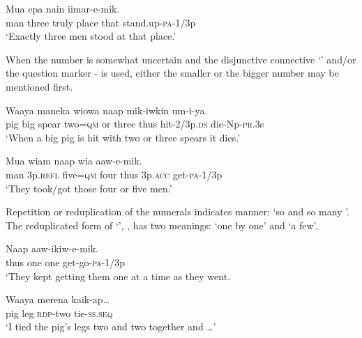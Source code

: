 \ea%
\label{ex:3:x661}
\gll Mua   epa nain iimar-e-mik. \\
man three truly place that stand.up-\textsc{pa}-1/3p\\
\glt`Exactly three men stood at that place.'
\z

When the number is somewhat uncertain and the disjunctive connective  `' and/or the question marker - is used, either the smaller or the bigger number may be mentioned first.

\ea%
\label{ex:3:x1416}
\gll Waaya maneka wiowa    naap mik-iwkin um-i-ya.\\
pig big spear two=\textsc{qm} or three thus hit-2/3p.\textsc{ds} die-Np-\textsc{pr}.3s\\
\glt`When a big pig is hit with two or three spears it dies.'
\z

\ea%
\label{ex:3:x92}
\gll Mua wiam   naap wia aaw-e-mik. \\
man 3p.\textsc{refl} five=\textsc{qm} four thus 3p.\textsc{acc} get-\textsc{pa}-1/3p\\
\glt`They took/got those four or five men.'
\z

Repetition  or reduplication  of the numerals indicates manner: `so and so many '. The reduplicated form of  `', , has two meanings: `one by one' and `a few'. 

\ea%
\label{ex:3:x93}
\gll Naap   aaw-ikiw-e-mik. \\
thus one one get-go-\textsc{pa}-1/3p\\
\glt`They kept getting them one at a time as they went.
\z

\ea%
\label{ex:3:x94}
\gll Waaya merena  kaik-ap{\dots} \\
pig leg \textsc{rdp}-two tie-\textsc{ss}.\textsc{seq}\\
\glt`I tied the pig's legs two and two together and {\dots}'
\z

